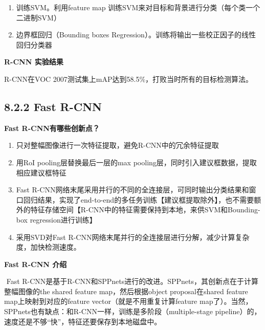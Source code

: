 \begin{enumerate}
\def\labelenumi{\arabic{enumi}.}
\setcounter{enumi}{3}
\item
  训练SVM。利用feature map
  训练SVM来对目标和背景进行分类（每个类一个二进制SVM）
\item
  边界框回归（Bounding boxes
  Regression）。训练将输出一些校正因子的线性回归分类器
\end{enumerate}

\begin{figure}
\centering
\caption{}
\end{figure}

\textbf{R-CNN 实验结果}

R-CNN在VOC 2007测试集上mAP达到58.5\%，打败当时所有的目标检测算法。

\begin{figure}
\centering
\caption{}
\end{figure}

\subsection{8.2.2 Fast R-CNN}\label{fast-r-cnn}

\textbf{Fast R-CNN有哪些创新点？}

\begin{enumerate}
\def\labelenumi{\arabic{enumi}.}
\item
  只对整幅图像进行一次特征提取，避免R-CNN中的冗余特征提取
\item
  用RoI pooling层替换最后一层的max
  pooling层，同时引入建议框数据，提取相应建议框特征
\item
  Fast
  R-CNN网络末尾采用并行的不同的全连接层，可同时输出分类结果和窗口回归结果，实现了end-to-end的多任务训练【建议框提取除外】，也不需要额外的特征存储空间【R-CNN中的特征需要保持到本地，来供SVM和Bounding-box
  regression进行训练】
\item
  采用SVD对Fast
  R-CNN网络末尾并行的全连接层进行分解，减少计算复杂度，加快检测速度。
\end{enumerate}

\textbf{Fast R-CNN 介绍}

​ Fast
R-CNN是基于R-CNN和SPPnets进行的改进。SPPnets，其创新点在于计算整幅图像的the
shared feature map，然后根据object proposal在shared feature
map上映射到对应的feature vector（就是不用重复计算feature
map了）。当然，SPPnets也有缺点：和R-CNN一样，训练是多阶段（multiple-stage
pipeline）的，速度还是不够``快''，特征还要保存到本地磁盘中。

